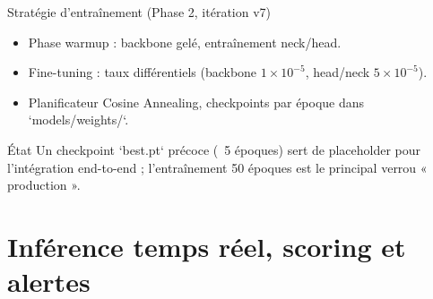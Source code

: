 \documentclass[aspectratio=169,11pt]{beamer}
\begin{document}
\begin{frame}{Stratégie d'entraînement (Phase 2, itération v7)}
  \begin{itemize}
    \item Phase warmup : backbone gelé, entraînement neck/head.
    \item Fine-tuning : taux différentiels (backbone \(1\times10^{-5}\), head/neck \(5\times10^{-5}\)).
    \item Planificateur Cosine Annealing, checkpoints par époque dans `models/weights/`.
  \end{itemize}

  \begin{alertblock}{État}
    Un checkpoint `best.pt` précoce (~5 époques) sert de placeholder pour l'intégration end-to-end ; l'entraînement 50 époques est le principal verrou « production ».
  \end{alertblock}
\end{frame}

\section{Inférence temps réel, scoring et alertes}
\end{document}
